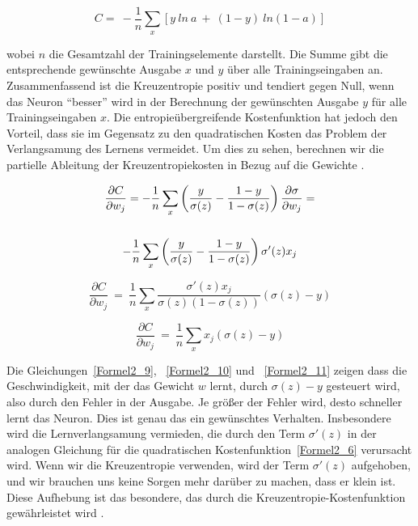   \begin{equation} \label{Formel2_8}
    C=\ -\frac{1}{n}\sum _{x}[ y\ ln\ a\ +\ ( 1-y) \ ln( 1-a)]
  \end{equation}

  wobei $n$ die Gesamtzahl der Trainingselemente darstellt. Die Summe gibt die entsprechende gewünschte Ausgabe $x$ und $y$ über alle Trainingseingaben an. Zusammenfassend ist die Kreuzentropie positiv und tendiert gegen Null, wenn das Neuron
  \enquote{besser} wird in der Berechnung der gewünschten Ausgabe $y$ für alle Trainingseingaben $x$.  Die entropieübergreifende Kostenfunktion hat jedoch den Vorteil, dass sie im Gegensatz zu den quadratischen Kosten das Problem der Verlangsamung des Lernens vermeidet. Um dies zu sehen, berechnen wir die partielle Ableitung der Kreuzentropiekosten in Bezug auf die Gewichte \cite*[63]{Nielsen2015}.

  \begin{gather} \label{Formel2_9}
    \frac{\partial C}{\partial w_{j}} =-\frac{1}{n}\sum _{x}\left(\frac{y}{\sigma ( z)} -\frac{1-y}{1-\sigma ( z)}\right)\frac{\partial \sigma }{\partial w_{j}} = \notag\\
    \notag\\
    -\frac{1}{n}\sum _{x}\left(\frac{y}{\sigma ( z)} -\frac{1-y}{1-\sigma ( z)}\right) \sigma '( z) x_{j} \notag\\
  \end{gather}

  \begin{equation} \label{Formel2_10}
    \frac{\partial C}{\partial w_{j}} \ =\ \frac{1}{n}\sum _{x}\frac{\sigma '( z) x_{j}}{\sigma ( z)( 1-\sigma ( z))}( \sigma ( z) -y)
  \end{equation}

  \begin{equation} \label{Formel2_11}
    \frac{\partial C}{\partial w_{j}} \ =\ \frac{1}{n}\sum _{x} x_{j}( \sigma ( z) -y)
  \end{equation}


  Die Gleichungen~\ref{Formel2_9}, ~\ref{Formel2_10} und ~\ref{Formel2_11} zeigen dass die Geschwindigkeit, mit der das Gewicht $w$  lernt, durch $\sigma(z) - y$ gesteuert wird, also durch den Fehler in der Ausgabe. Je größer der Fehler wird, desto schneller lernt das Neuron. Dies ist genau das ein gewünschtes Verhalten. Insbesondere wird die Lernverlangsamung vermieden, die durch den Term $\sigma'(z)$ in der analogen Gleichung für die quadratischen Kostenfunktion~\ref{Formel2_6} verursacht wird. Wenn wir die Kreuzentropie verwenden, wird der Term $\sigma'(z)$ aufgehoben, und wir brauchen uns keine Sorgen mehr darüber zu machen, dass er klein ist. Diese Aufhebung ist das besondere, das durch die Kreuzentropie-Kostenfunktion gewährleistet wird \cite[63-64]{Nielsen2015}.

